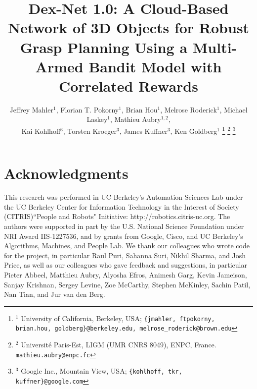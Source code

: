 \documentclass[letterpaper, 10 pt, conference]{ieeeconf}  %
\begin{document}
\title{\LARGE \bf Dex-Net 1.0: A Cloud-Based Network of 3D Objects for Robust Grasp Planning Using a Multi-Armed Bandit Model with Correlated Rewards
	\vspace{-2ex}
	}
\author{Jeffrey Mahler$^1$, Florian T. Pokorny$^1$, Brian Hou$^1$, Melrose Roderick$^1$, Michael Laskey$^1$, Mathieu Aubry$^{1,2}$, \\
Kai Kohlhoff$^3$, Torsten Kroeger$^3$, James Kuffner$^3$, Ken Goldberg$^{1}$
\thanks{{\small $^1$ University of California, Berkeley, USA; {\tt\small \{jmahler, ftpokorny, brian.hou, goldberg\}@berkeley.edu, melrose\_roderick@brown.edu}}}%
\thanks{{\small $^2$ Universit\'e Paris-Est, LIGM (UMR CNRS 8049), ENPC, France. {\tt\small mathieu.aubry@enpc.fc}}}%
\thanks{{\small $^3$ Google Inc., Mountain View, USA; {\tt\small \{kohlhoff, tkr, kuffner\}@google.com}} }
}
\maketitle


%


%


%




%

\section{Acknowledgments}
{\small
This research was performed in UC Berkeley's Automation Sciences Lab under the UC Berkeley Center for Information Technology in the Interest of Society (CITRIS)``People and Robots" Initiative: http://robotics.citris-uc.org.
The authors were supported in part by the U.S. National Science Foundation under NRI Award IIS-1227536, and by grants from Google, Cisco, and UC Berkeley's Algorithms, Machines, and People Lab.
We thank our colleagues who wrote code for the project, in particular Raul Puri, Sahanna Suri, Nikhil Sharma, and Josh Price, as well as our colleagues who gave feedback and suggestions, in particular Pieter Abbeel, Matthieu Aubry, Alyosha Efros, Animesh Garg, Kevin Jameison, Sanjay Krishnan, Sergey Levine, Zoe McCarthy, Stephen McKinley, Sachin Patil, Nan Tian, and Jur van den Berg.
}



\end{document}

